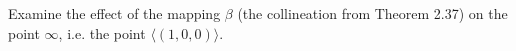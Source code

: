 Examine the effect of the mapping $\beta$ (the collineation from Theorem 2.37) on the point $\infty$, i.e. the point $\langle(1, 0, 0)\rangle$.
